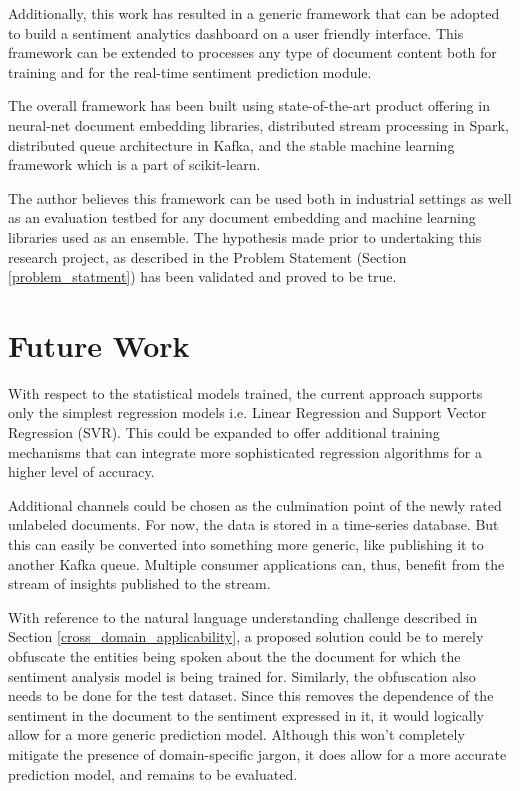 \documentclass[conference]{IEEEtran}
\begin{document}
    Additionally, this work has resulted in a generic framework that can be adopted to build a sentiment analytics dashboard on a user friendly interface. 
    This framework can be extended to processes any type of document content both for training and for the real-time sentiment prediction module.

    The overall framework has been built using state-of-the-art product offering in neural-net document embedding libraries, distributed stream processing in Spark, distributed queue architecture in Kafka, and the stable machine learning framework which is a part of scikit-learn. 

    The author believes this framework can be used both in industrial settings as well as an evaluation testbed for any document embedding and machine learning libraries used as an ensemble. The hypothesis made prior to undertaking this research project, as described in the Problem Statement (Section \ref{problem_statment}) has been validated and proved to be true.

\vspace{5mm}

\section{Future Work} \label{future_work}
    With respect to the statistical models trained, the current approach supports only the simplest regression models i.e. Linear Regression and Support Vector Regression (SVR). 
    This could be expanded to offer additional training mechanisms that can integrate more sophisticated regression algorithms for a higher level of accuracy.
     
    Additional channels could be chosen as the culmination point of the newly rated unlabeled documents.
    For now, the data is stored in a time-series database.
    But this can easily be converted into something more generic, like publishing it to another Kafka queue.
    Multiple consumer applications can, thus, benefit from the stream of insights published to the stream.

    With reference to the natural language understanding challenge described in Section \ref{cross_domain_applicability}, a proposed solution could be to merely obfuscate the entities being spoken about the the document for which the sentiment analysis model is being trained for. 
    Similarly, the obfuscation also needs to be done for the test dataset. 
    Since this removes the dependence of the sentiment in the document to the sentiment expressed in it, it would logically allow for a more generic prediction model. 
    Although this won't completely mitigate the presence of domain-specific jargon, it does allow for a more accurate prediction model, and remains to be evaluated.
\end{document}
